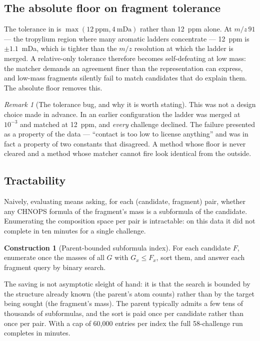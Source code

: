 \documentclass[11pt,twocolumn,a4paper]{article}
\theoremstyle{definition}
\newtheorem{construction}[theorem]{Construction}
\theoremstyle{remark}
\newtheorem{remark}[theorem]{Remark}
\newcommand{\ppm}{\mathrm{ppm}}
\begin{document}
\subsection{The absolute floor on fragment tolerance}

The tolerance in  is $\max(12~\ppm, 4~\mathrm{mDa})$ rather than
12~ppm alone. At $m/z\,91$ --- the tropylium region where many aromatic ladders
concentrate --- 12~ppm is $\pm 1.1$~mDa, which is tighter than the $m/z$
resolution at which the ladder is merged. A relative-only tolerance therefore
becomes self-defeating at low mass: the matcher demands an agreement finer than
the representation can express, and low-mass fragments silently fail to match
candidates that do explain them. The absolute floor removes this.

\begin{remark}[The tolerance bug, and why it is worth stating]
This was not a design choice made in advance. In an earlier configuration the
ladder was merged at $10^{-3}$ and matched at 12~ppm, and \emph{every} challenge
declined. The failure presented as a property of the data --- ``contact is too
low to license anything''  and was in fact a property of two constants that
disagreed. A method whose floor is never cleared and a method whose matcher
cannot fire look identical from the outside.
\end{remark}



\subsection{Tractability}

Naively, evaluating  means asking, for each (candidate,
fragment) pair, whether any CHNOPS formula of the fragment's mass is a subformula
of the candidate. Enumerating the composition space per pair is intractable: on
this data it did not complete in ten minutes for a single challenge.

\begin{construction}[Parent-bounded subformula index]
\label{con:index}
For each candidate $F$, enumerate once the masses of all $G$ with $G_x \le F_x$,
sort them, and answer each fragment query by binary search.
\end{construction}

The saving is not asymptotic sleight of hand: it is that the search is bounded by
the structure already known (the parent's atom counts) rather than by the target
being sought (the fragment's mass). The parent typically admits a few tens of
thousands of subformulas, and the sort is paid once per candidate rather than once
per pair. With a cap of 60{,}000 entries per index the full 58-challenge run
completes in minutes.
\end{document}
